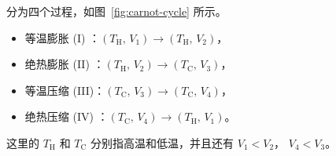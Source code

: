 分为四个过程，如图~\ref{fig:carnot-cycle} 所示。
\begin{itemize}
  \item 等温膨胀 (I)  ：$(T_\text{H}, \, V_1) \to (T_\text{H}, \, V_2)$，
  \item 绝热膨胀 (II) ：$(T_\text{H}, \, V_2) \to (T_\text{C}, \, V_3)$，
  \item 等温压缩 (III)：$(T_\text{C}, \, V_3) \to (T_\text{C}, \, V_4)$，
  \item 绝热压缩 (IV) ：$(T_\text{C}, \, V_4) \to (T_\text{H}, \, V_1)$。
\end{itemize}
这里的 $T_\text{H}$ 和 $T_\text{C}$ 分别指高温和低温，并且还有 $V_1 < V_2$，
$V_4 < V_3$。

%     
%     
%     
%     
%     
%     
%     
%     
%     

